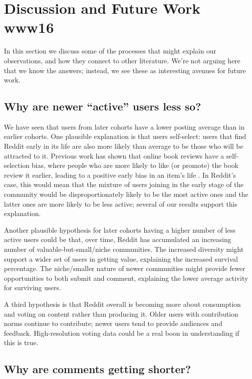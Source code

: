 \section{Discussion and Future Work www16}

In this section we discuss some of the processes that might explain our observations, and how they connect to other literature.  We're not arguing here that we know the answers; instead, we see these as interesting avenues for future work.  

\subsection{Why are newer ``active'' users less so?}

We have seen that users from later cohorts have a lower posting average than in earlier cohorts. 
One plausible explanation is that users self-select: users that find Reddit early in its life are also more likely than average to be those who will be attracted to it. Previous work has shown that online book reviews have a self-selection bias, where people who are more likely to like (or promote) the book review it earlier, leading to a positive early bias in an item's life \cite{Li2008}.  In Reddit's case, this would mean that the mixture of users joining in the early stage of the community would be disproportionately likely to be the most active ones and the latter ones are more likely to be less active; several of our results support this explanation.

Another plausible hypothesis for later cohorts having a higher number of less active users could be that, over time, Reddit has accumulated an increasing number of valuable-but-small/niche communities.  The increased diversity might support a wider set of users in getting value, explaining the increased survival percentage.  The niche/smaller nature of newer communities might provide fewer opportunities to both submit and comment, explaining the lower average activity for surviving users. 

A third hypothesis is that Reddit overall is becoming more about consumption and voting on content rather than producing it.  Older users with contribution norms continue to contribute; newer users tend to provide audiences and feedback.  High-resolution voting data could be a real boon in understanding if this is true.

\subsection{Why are comments getting shorter?}

